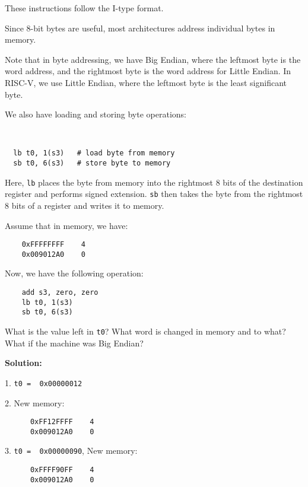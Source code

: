 These instructions follow the I-type format.

Since 8-bit bytes are useful, most architectures address individual bytes in memory.

Note that in byte addressing, we have Big Endian, where the leftmost byte is the word address, and the rightmost byte is the word address for Little Endian. In RISC-V, we use Little Endian, where the leftmost byte is the least significant byte.

We also have loading and storing byte operations: 
\begin{codeBlock}~
\begin{verbatim}
  lb t0, 1(s3)   # load byte from memory
  sb t0, 6(s3)   # store byte to memory
\end{verbatim}
\end{codeBlock}

Here, \verb|lb| places the byte from memory into the rightmost 8 bits of the destination register and performs signed extension. \verb|sb| then takes the byte from the rightmost 8 bits of a register and writes it to memory.

\begin{eg}
  Assume that in memory, we have:
  \begin{verbatim}
    0xFFFFFFFF    4
    0x009012A0    0
  \end{verbatim}
  Now, we have the following operation:
  \begin{verbatim}
    add s3, zero, zero
    lb t0, 1(s3)
    sb t0, 6(s3)
  \end{verbatim}
  What is the value left in \verb|t0|? What word is changed in memory and to what? What if the machine was Big Endian? 

  \textbf{Solution:} 

  1. \verb|t0 =  0x00000012|
  
  2. New memory:
    \begin{verbatim}
      0xFF12FFFF    4
      0x009012A0    0
    \end{verbatim}

  3. \verb|t0 =  0x00000090|, New memory:
    \begin{verbatim}
      0xFFFF90FF    4
      0x009012A0    0
    \end{verbatim}
\end{eg}